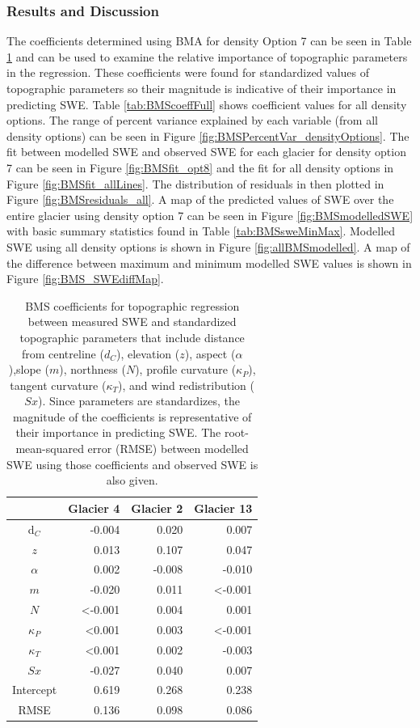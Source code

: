 \documentclass[12pt]{article}
\begin{document}
\subsubsection{Results and Discussion}

The coefficients determined using BMA for density Option 7 can be seen in Table \ref{tab:BMScoeff} and can be used to examine the relative importance of topographic parameters in the regression. These coefficients were found for standardized values of topographic parameters so their magnitude is indicative of their importance in predicting SWE. Table \ref{tab:BMScoeffFull} shows coefficient values for all density options. The range of percent variance explained by each variable (from all density options) can be seen in Figure \ref{fig:BMSPercentVar_densityOptions}. The fit between modelled SWE and observed SWE for each glacier for density option 7 can be seen in Figure \ref{fig:BMSfit_opt8} and the fit for all density options in Figure \ref{fig:BMSfit_allLines}. The distribution of residuals in then plotted in Figure \ref{fig:BMSresiduals_all}. A map of the predicted values of SWE over the entire glacier using density option 7 can be seen in Figure \ref{fig:BMSmodelledSWE} with basic summary statistics found in Table \ref{tab:BMSsweMinMax}. Modelled SWE using all density options is shown in Figure \ref{fig:allBMSmodelled}. A map of the difference between maximum and minimum modelled SWE values is shown in Figure \ref{fig:BMS_SWEdiffMap}.

\begin{table}
\centering
\caption{BMS coefficients for topographic regression between measured SWE and standardized topographic parameters that include distance from centreline ($d_C$), elevation ($z$), aspect ($\alpha$),slope ($m$), northness ($N$), profile curvature ($\kappa_P$), tangent curvature ($\kappa_T$), and wind redistribution ($Sx$). Since parameters are standardizes, the magnitude of the coefficients is representative of their importance in predicting SWE. The root-mean-squared error (RMSE) between modelled SWE using those coefficients and observed SWE is also given.}
\label{tab:BMScoeff}
\begin{tabular}{crrr}
 & \textbf{Glacier 4} & \textbf{Glacier 2} & \textbf{Glacier 13} \\ \hline
d$_C$ 			& -0.004 					& 0.020 	& 0.007 \\
$z$ 				&  0.013 					& 0.107 	& 0.047 \\
$\alpha$ 		& 0.002 					& -0.008 	& -0.010 \\
$m$ 			& -0.020 					& 0.011 	&  \textless-0.001 \\
$N$ 				&   \textless-0.001 	& 0.004 	& 0.001 \\
$\kappa_P$ 	&  \textless0.001 	& 0.003 	&\textless -0.001 \\
$\kappa_T$ 	& \textless0.001 		& 0.002 	& -0.003 \\
$Sx$ 			& -0.027 					& 0.040 	& 0.007 \\
Intercept 		& 0.619 					& 0.268 	& 0.238 \\ \hline
RMSE 			& 0.136 					& 0.098	& 0.086 
\end{tabular}
\end{table}
\end{document}
